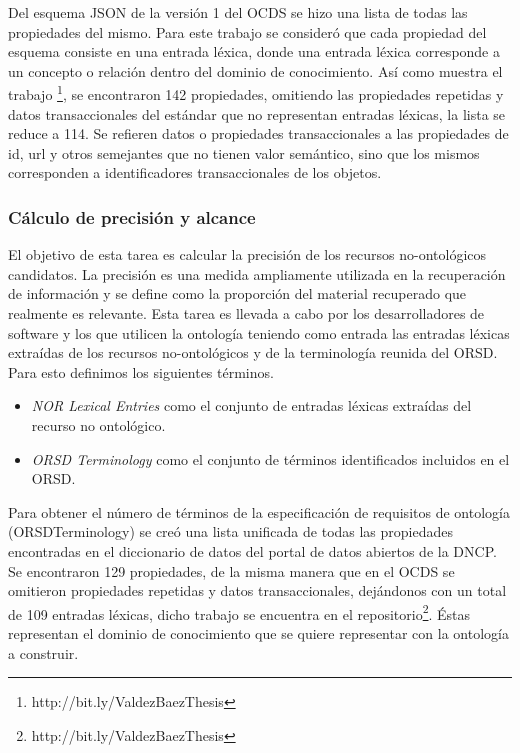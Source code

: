 Del esquema JSON de la versión 1 del OCDS se hizo una lista de todas las propiedades del mismo. Para este trabajo se consideró que cada propiedad del esquema consiste en una entrada léxica, donde una entrada léxica corresponde a un concepto o relación dentro del dominio de conocimiento. Así como muestra el trabajo \footnote{http://bit.ly/ValdezBaezThesis}, se encontraron 142 propiedades, omitiendo las propiedades repetidas y datos transaccionales del estándar que no representan entradas léxicas, la lista se reduce a 114. Se refieren datos o propiedades transaccionales a las propiedades de id, url y otros semejantes que no tienen valor semántico, sino que los mismos corresponden a identificadores transaccionales de los objetos.

\subsubsection{Cálculo de precisión y alcance}

El objetivo de esta tarea es calcular la precisión de los recursos no-ontológicos candidatos. La precisión es una medida ampliamente utilizada en la recuperación de información y se define como la proporción del material recuperado que realmente es relevante. Esta tarea es llevada a cabo por los desarrolladores de software y los que utilicen la ontología teniendo como entrada las entradas léxicas extraídas de los recursos no-ontológicos y de la terminología reunida del ORSD. Para esto definimos los siguientes términos.

\begin{itemize}
    \item \textit{NOR Lexical Entries}  como el conjunto de entradas léxicas extraídas del recurso no ontológico.	
    \item \textit{ORSD Terminology} como el conjunto de términos identificados incluidos en el ORSD. 
\end{itemize}

Para obtener el número de términos de la especificación de requisitos de ontología (ORSDTerminology) se creó una lista unificada de todas las propiedades encontradas en el diccionario de datos del portal de datos abiertos de la DNCP.  Se encontraron 129 propiedades, de la misma manera que en el OCDS se omitieron propiedades repetidas y datos transaccionales, dejándonos con un total de 109 entradas léxicas, dicho trabajo se encuentra en el repositorio\footnote{http://bit.ly/ValdezBaezThesis}. Éstas representan el dominio de conocimiento que se quiere representar con la ontología a construir.

